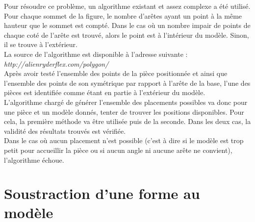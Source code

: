 \documentclass[a4paper, 11pt]{report}
\begin{document}
    Pour résoudre ce problème, un algorithme existant et assez complexe a été utilisé. Pour chaque sommet de la figure, le nombre d'arêtes ayant un point à la même hauteur que le sommet est compté. Dans le cas où un nombre impair de points de chaque coté de l'arête est trouvé, alors le point est à l'intérieur du modèle. Sinon, il se trouve à l'extérieur.\\
    La source de l'algorithme est disponible à l'adresse suivante : \emph{http://alienryderflex.com/polygon/}\\ 

    Après avoir testé l'ensemble des points de la pièce positionnée et ainsi que l'ensemble des points de son symétrique par rapport à l'arête de la base, l'une des pièces est identifiée comme étant en partie à l'extérieur du modèle.\\ 

    L'algorithme chargé de générer l'ensemble des placements possibles va donc pour une pièce et un modèle donnés, tenter de trouver les positions disponibles. Pour cela, la première méthode va être utilisée puis de la seconde. Dans les deux cas, la validité des résultats trouvés est vérifiée.\\
    Dans le cas où aucun placement n'est possible (c'est à dire si le modèle est trop petit pour accueillir la pièce ou si aucun angle ni aucune arête ne convient), l'algorithme échoue.
	
		\section{Soustraction d'une forme au modèle}
		
\end{document}
